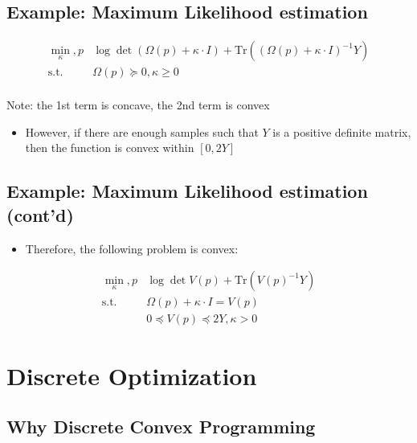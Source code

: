 \documentclass[]{article}
\providecommand{\tightlist}{%
  \setlength{\itemsep}{0pt}\setlength{\parskip}{0pt}}
\begin{document}
\hypertarget{example-maximum-likelihood-estimation}{%
\subsection{Example: Maximum Likelihood
estimation}\label{example-maximum-likelihood-estimation}}

\[\begin{array}{ll}
      \min_\kappa, p   &      \log \det (\Omega(p) + \kappa
       \cdot I) + \mathrm{Tr}((\Omega(p) + \kappa \cdot I)^{-1}Y) \\
      \text{s.t.} & \Omega(p) \succeq 0, \kappa \geq 0 \\
 \end{array}\]

Note: the 1st term is concave, the 2nd term is convex

\begin{itemize}
\tightlist
\item
  However, if there are enough samples such that \(Y\) is a positive
  definite matrix, then the function is convex within \([0, 2Y]\)
\end{itemize}

\hypertarget{example-maximum-likelihood-estimation-contd}{%
\subsection{Example: Maximum Likelihood estimation
(cont'd)}\label{example-maximum-likelihood-estimation-contd}}

\begin{itemize}
\tightlist
\item
  Therefore, the following problem is convex:
\end{itemize}

\[\begin{array}{ll}
      \min_\kappa, p   &   \log \det V(p) + \mathrm{Tr}(V(p)^{-1}Y) \\
      \text{s.t.} & \Omega(p) + \kappa \cdot I = V(p) \\
                    & 0 \preceq V(p) \preceq 2Y, \kappa {>} 0
\end{array}\]

\hypertarget{discrete-optimization}{%
\section{Discrete Optimization}\label{discrete-optimization}}

\hypertarget{why-discrete-convex-programming}{%
\subsection{Why Discrete Convex
Programming}\label{why-discrete-convex-programming}}
\end{document}
